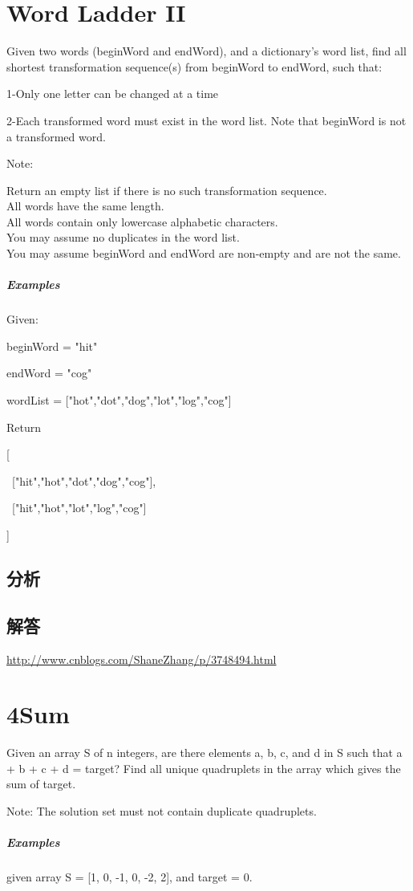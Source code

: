 \documentclass[UTF8,a4paper,12pt]{ctexbook}
\begin{document}
\section{Word Ladder II}
		Given two words (beginWord and endWord), and a dictionary's word list, find all shortest transformation sequence(s) from beginWord to endWord, such that:
		
		1-Only one letter can be changed at a time
		
		2-Each transformed word must exist in the word list. Note that beginWord is not a transformed word.
		
		Note:
		
		Return an empty list if there is no such transformation sequence.\\
		All words have the same length.\\
		All words contain only lowercase alphabetic characters.\\
		You may assume no duplicates in the word list.\\
		You may assume beginWord and endWord are non-empty and are not the same.
	\subparagraph{Examples}
		Given:
		
		beginWord = "hit"
		
		endWord = "cog"
		
		wordList = ["hot","dot","dog","lot","log","cog"]
		
		Return
		
		[
		
	\	["hit","hot","dot","dog","cog"],
		
	\	["hit","hot","lot","log","cog"]
		
		]
	\subsection{分析}
	
	\subsection{解答}
		\url{http://www.cnblogs.com/ShaneZhang/p/3748494.html}
	
\section{4Sum}
	Given an array S of n integers, are there elements a, b, c, and d in S such that a + b + c + d = target? Find all unique quadruplets in the array which gives the sum of target.
	
	Note: The solution set must not contain duplicate quadruplets.
	\subparagraph{Examples}
		given array S = [1, 0, -1, 0, -2, 2], and target = 0.
		
\end{document}
